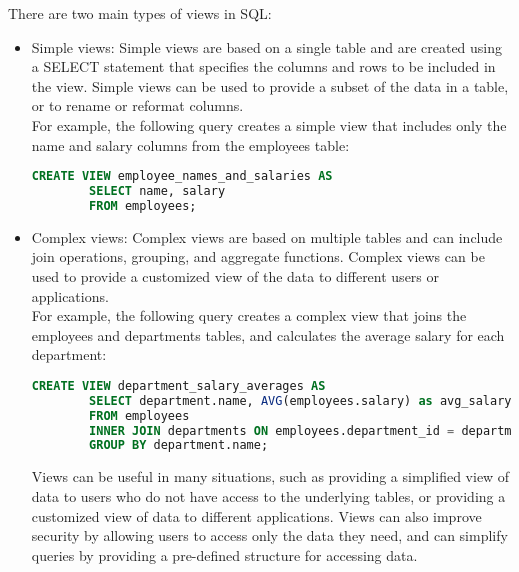\documentclass{article}
\begin{document}
There are two main types of views in SQL:
\begin{itemize}
    \item Simple views: Simple views are based on a single table and are created using a SELECT statement that specifies the columns and rows to be included in the view. Simple views can be used to provide a subset of the data in a table, or to rename or reformat columns.\\
    
    For example, the following query creates a simple view that includes only the name and salary columns from the employees table:
    \begin{lstlisting}[language=SQL]
        CREATE VIEW employee_names_and_salaries AS
        SELECT name, salary
        FROM employees;
    \end{lstlisting}
    \item Complex views: Complex views are based on multiple tables and can include join operations, grouping, and aggregate functions. Complex views can be used to provide a customized view of the data to different users or applications.\\
    
    For example, the following query creates a complex view that joins the employees and departments tables, and calculates the average salary for each department:
    \begin{lstlisting}[language=SQL]
        CREATE VIEW department_salary_averages AS
        SELECT department.name, AVG(employees.salary) as avg_salary
        FROM employees
        INNER JOIN departments ON employees.department_id = departments.id
        GROUP BY department.name;
    \end{lstlisting}
    Views can be useful in many situations, such as providing a simplified view of data to users who do not have access to the underlying tables, or providing a customized view of data to different applications. Views can also improve security by allowing users to access only the data they need, and can simplify queries by providing a pre-defined structure for accessing data.
\end{itemize}
\end{document}

